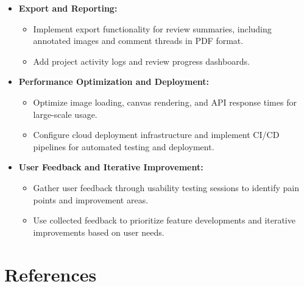 \documentclass[12pt,a4paper]{article}
\begin{document}
\begin{itemize}
    \item[\textbf{$\triangleright$}] \textbf{Export and Reporting:}
    \begin{itemize}
        \item Implement export functionality for review summaries, including annotated images and comment threads in PDF format.
        \item Add project activity logs and review progress dashboards.
    \end{itemize}

    \item[\textbf{$\triangleright$}] \textbf{Performance Optimization and Deployment:}
    \begin{itemize}
        \item Optimize image loading, canvas rendering, and API response times for large-scale usage.
        \item Configure cloud deployment infrastructure and implement CI/CD pipelines for automated testing and deployment.
    \end{itemize}

    \item[\textbf{$\triangleright$}] \textbf{User Feedback and Iterative Improvement:}
    \begin{itemize}
        \item Gather user feedback through usability testing sessions to identify pain points and improvement areas.
        \item Use collected feedback to prioritize feature developments and iterative improvements based on user needs.
    \end{itemize}
\end{itemize}

\section{References}
\end{document}
